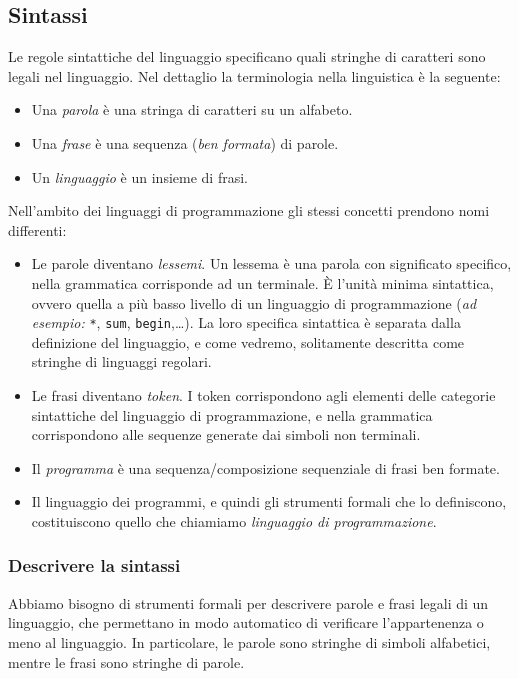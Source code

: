 \documentclass[oneside,a4paper,11pt]{book}
\theoremstyle{italicstyle}
\theoremstyle{normStyle}
\begin{document}
\subsection{Sintassi}
Le regole sintattiche del linguaggio specificano quali stringhe 
di caratteri sono legali nel linguaggio. Nel dettaglio la terminologia 
nella linguistica è la seguente:
\begin{itemize}
  \item Una \textit{parola} è una stringa di caratteri su un alfabeto.
  \item Una \textit{frase} è una sequenza (\textit{ben formata}) di parole.
  \item Un \textit{linguaggio} è un insieme di frasi.
\end{itemize}
Nell'ambito dei linguaggi di programmazione gli stessi concetti 
prendono nomi differenti:
\begin{itemize}
  \item Le parole diventano \textit{lessemi}. Un lessema è una 
  parola con significato specifico, nella grammatica corrisponde ad un terminale.
  È l'unità minima sintattica, ovvero quella a più basso livello di un linguaggio 
  di programmazione (\textit{ad esempio:} \verb|*|, \verb|sum|, \verb|begin|,\dots). La 
  loro specifica sintattica è separata dalla definizione del linguaggio, e come vedremo,
  solitamente descritta come stringhe di linguaggi regolari.
  \item Le frasi diventano \textit{token}. I token corrispondono 
  agli elementi delle categorie sintattiche del linguaggio di programmazione, 
  e nella grammatica corrispondono alle sequenze generate dai simboli 
  non terminali.
  \item Il \textit{programma} è una sequenza/composizione sequenziale 
  di frasi ben formate.
  \item Il linguaggio dei programmi, e quindi gli strumenti formali 
  che lo definiscono, costituiscono quello che chiamiamo \textit{linguaggio 
  di programmazione}.
\end{itemize}
\subsubsection{Descrivere la sintassi}
Abbiamo bisogno di strumenti formali per descrivere parole 
e frasi legali di un linguaggio, che permettano in modo automatico 
di verificare l'appartenenza o meno al linguaggio. In particolare, 
le parole sono stringhe di simboli alfabetici, mentre le frasi sono stringhe di 
parole.
\end{document}
